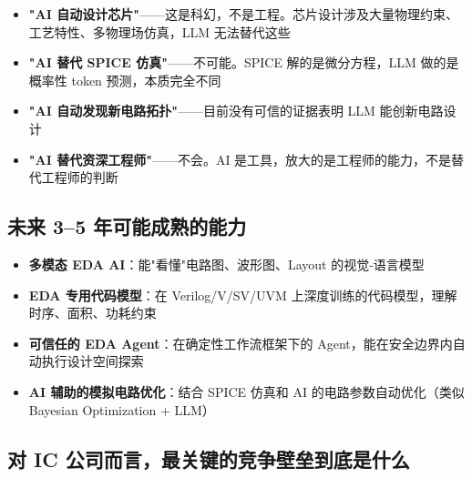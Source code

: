 \documentclass[UTF8,a4paper,10pt,oneside]{ctexart}
\begin{document}
\begin{itemize}
    \item \textbf{"AI 自动设计芯片"}——这是科幻，不是工程。芯片设计涉及大量物理约束、工艺特性、多物理场仿真，LLM 无法替代这些
    \item \textbf{"AI 替代 SPICE 仿真"}——不可能。SPICE 解的是微分方程，LLM 做的是概率性 token 预测，本质完全不同
    \item \textbf{"AI 自动发现新电路拓扑"}——目前没有可信的证据表明 LLM 能创新电路设计
    \item \textbf{"AI 替代资深工程师"}——不会。AI 是工具，放大的是工程师的能力，不是替代工程师的判断
\end{itemize}

\subsection{未来 3--5 年可能成熟的能力}

\begin{itemize}
    \item \textbf{多模态 EDA AI}：能"看懂"电路图、波形图、Layout 的视觉-语言模型
    \item \textbf{EDA 专用代码模型}：在 Verilog/V/SV/UVM 上深度训练的代码模型，理解时序、面积、功耗约束
    \item \textbf{可信任的 EDA Agent}：在确定性工作流框架下的 Agent，能在安全边界内自动执行设计空间探索
    \item \textbf{AI 辅助的模拟电路优化}：结合 SPICE 仿真和 AI 的电路参数自动优化（类似 Bayesian Optimization + LLM）
\end{itemize}

\subsection{对 IC 公司而言，最关键的竞争壁垒到底是什么}

\begin{center}
\end{center}
\end{document}
